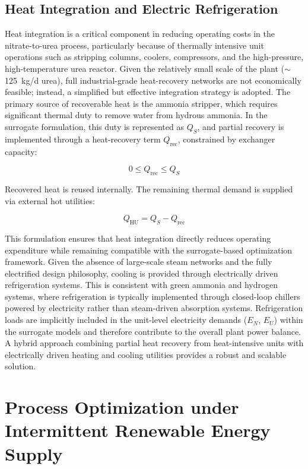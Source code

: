 \documentclass[letterpaper]{article}
\begin{document}
\subsection{Heat Integration and Electric Refrigeration}
Heat integration is a critical component in reducing operating costs
in the nitrate-to-urea process, particularly because of thermally
intensive unit operations such as stripping columns, coolers,
compressors, and the high-pressure, high-temperature urea
reactor. Given the relatively small scale of the plant
($\sim$125~kg/d urea), full industrial-grade heat-recovery networks
are not economically feasible; instead, a simplified but effective
integration strategy is adopted. The primary source of recoverable
heat is the ammonia stripper, which requires significant thermal duty
to remove water from hydrous ammonia. In the surrogate formulation,
this duty is represented as $Q_S$, and partial recovery is
implemented through a heat-recovery term $Q_{\mathrm{rec}}$,
constrained by exchanger capacity:

\begin{equation}
0 \leq Q_{\mathrm{rec}} \leq Q_S
\end{equation}

\noindent Recovered heat is reused internally. The remaining thermal
demand is supplied via external hot utilities:

\begin{equation}
Q_{\mathrm{HU}} = Q_S - Q_{\mathrm{rec}}
\end{equation}

\noindent This formulation ensures that heat integration directly
reduces operating expenditure while remaining compatible with the
surrogate-based optimization framework. Given the absence of
large-scale steam networks and the fully electrified design
philosophy, cooling is provided through electrically driven
refrigeration systems. This is consistent with green ammonia and
hydrogen systems, where refrigeration is typically implemented
through closed-loop chillers powered by electricity rather than
steam-driven absorption systems. Refrigeration loads are implicitly
included in the unit-level electricity demands ($E_N$, $E_U$) within
the surrogate models and therefore contribute to the overall plant
power balance. A hybrid approach combining partial heat recovery from
heat-intensive units with electrically driven heating and cooling
utilities provides a robust and scalable solution.

\section{Process Optimization under Intermittent Renewable Energy
  Supply}
\end{document}
